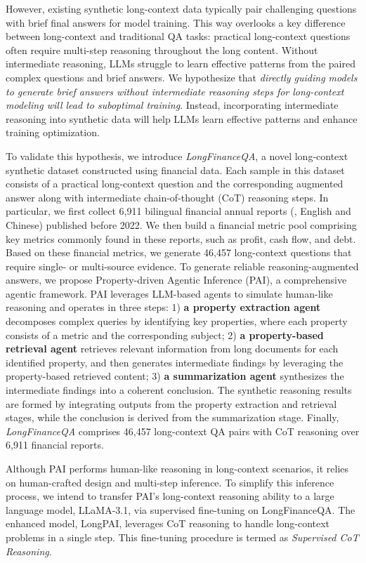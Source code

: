 However, existing synthetic long-context data typically pair challenging questions with brief final answers for model training. This way overlooks a key difference between long-context and traditional QA tasks: practical long-context questions often require multi-step reasoning throughout the long content.
Without intermediate reasoning, LLMs struggle to learn effective patterns from the paired complex questions and brief answers.
We hypothesize that \emph{directly guiding models to generate brief answers without intermediate reasoning steps for long-context modeling will lead to suboptimal training}.
Instead, incorporating intermediate reasoning into synthetic data will help LLMs learn effective patterns and enhance training optimization.

To validate this hypothesis, we introduce \emph{LongFinanceQA}, a novel long-context synthetic dataset constructed using financial data. Each sample in this dataset consists of a practical long-context question and the corresponding augmented answer along with intermediate chain-of-thought (CoT) reasoning steps.
In particular, we first collect 6,911 bilingual financial annual reports (\ie, English and Chinese) published before 2022. We then build a financial metric pool comprising key metrics commonly found in these reports, such as profit, cash flow, and debt. 
Based on these financial metrics, we generate 46,457 long-context questions that require single- or multi-source evidence. 
To generate reliable reasoning-augmented answers, we propose Property-driven Agentic Inference (PAI), a comprehensive agentic framework. PAI leverages LLM-based agents to simulate human-like reasoning and operates in three steps:
1) \textbf{a property extraction agent} decomposes complex queries by identifying key properties, where each property consists of a metric and the corresponding subject;
2) \textbf{a property-based retrieval agent} retrieves relevant information from long documents for each identified property, and then generates intermediate findings by leveraging the property-based retrieved content;
3) \textbf{a summarization agent} synthesizes the intermediate findings into a coherent conclusion.
The synthetic reasoning results are formed by integrating outputs from the property extraction and retrieval stages, while the conclusion is derived from the summarization stage.
Finally, \emph{LongFinanceQA} comprises 46,457 long-context QA pairs with CoT reasoning over 6,911 financial reports.

Although PAI performs human-like reasoning in long-context scenarios, it relies on human-crafted design and multi-step inference. To simplify this inference process, we intend to transfer PAI's long-context reasoning ability to a large language model, LLaMA-3.1, via supervised fine-tuning on LongFinanceQA. The enhanced model, LongPAI, leverages CoT reasoning to handle long-context problems in a single step. This fine-tuning procedure is termed as \emph{Supervised CoT Reasoning}.

